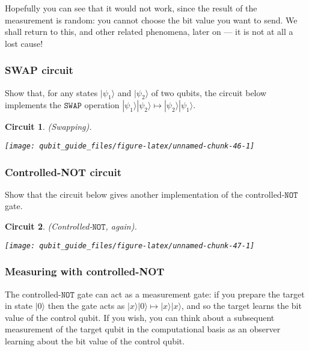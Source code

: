 \documentclass[fleqn]{article}
\newtheorem*{circuit}{Circuit}
\begin{document}
Hopefully you can see that it would not work, since the result of the measurement is random: you cannot choose the bit value you want to send.
We shall return to this, and other related phenomena, later on --- it is not at all a lost cause!

\hypertarget{swap-circuit}{%
\subsubsection{SWAP circuit}\label{swap-circuit}}

Show that, for any states \(|\psi_1\rangle\) and \(|\psi_2\rangle\) of two qubits, the circuit below implements the \(\texttt{SWAP}\) operation \(|\psi_1\rangle|\psi_2\rangle \mapsto |\psi_2\rangle|\psi_1\rangle\).

\begin{circuit}

(Swapping).

\begin{center}\texttt{[image: qubit\_guide\_files/figure-latex/unnamed-chunk-46-1]} \end{center}

\end{circuit}

\hypertarget{controlled-not-circuit}{%
\subsubsection{Controlled-NOT circuit}\label{controlled-not-circuit}}

Show that the circuit below gives another implementation of the controlled-\(\texttt{NOT}\) gate.

\begin{circuit}

(Controlled-\(\texttt{NOT}\), again).

\begin{center}\texttt{[image: qubit\_guide\_files/figure-latex/unnamed-chunk-47-1]} \end{center}

\end{circuit}

\hypertarget{measuring-with-controlled-not}{%
\subsubsection{Measuring with controlled-NOT}\label{measuring-with-controlled-not}}

The controlled-\(\texttt{NOT}\) gate can act as a measurement gate: if you prepare the target in state \(|0\rangle\) then the gate acts as \(|x\rangle|0\rangle\mapsto|x\rangle|x\rangle\), and so the target learns the bit value of the control qubit.
If you wish, you can think about a subsequent measurement of the target qubit in the computational basis as an observer learning about the bit value of the control qubit.
\end{document}
